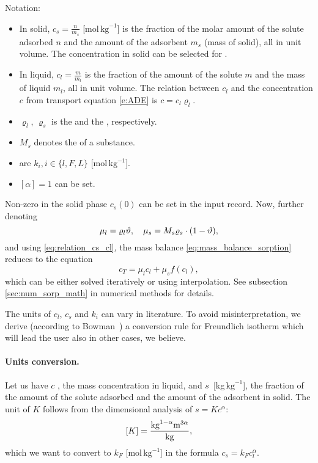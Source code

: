 Notation:
\begin{itemize}
 \item In solid, $c_s = \frac{n}{m_s}$ [mol\,$\mathrm{kg}^{-1}$] is the fraction of the molar amount of the solute 
       adsorbed $n$ and the amount of the adsorbent $m_s$ (mass of solid), all in unit volume. The concentration
       in solid can be selected for .
 \item In liquid, $c_l = \frac{m}{m_l}$ \units{}{}{} is the fraction of the amount of the solute $m$ and 
       the mass of liquid $m_l$, all in unit volume. The relation between $c_l$ and the concentration $c$ from 
       transport equation \eqref{e:ADE} is $c = c_l \varrho_l$.
 \item $\varrho_l$, $\varrho_s$ is the  and 
       the , respectively.
 \item $M_s$ denotes the  of a substance.
 \item {} are $k_i, i\in\{ l,F,L\}$ [mol\,$\mathrm{kg}^{-1}$].
 \item {} $[\alpha] = 1$ can be set.
\end{itemize}

Non-zero  in the solid phase $c_s(0)$ can be set in the input record. 
Now, further denoting \[ \mu_l = \varrho_l \vartheta, \quad \mu_s = M_s \varrho_s\cdot(1-\vartheta), \]
and using \eqref{eq:relation_cs_cl}, the mass balance \eqref{eq:mass_balance_sorption} reduces to the equation
\begin{equation}
 c_T = \mu_l c_l + \mu_s f(c_l),
 \label{eq:nonlin_sorption}
\end{equation}
which can be either solved iteratively or using interpolation. See subsection \ref{sec:num_sorp_math} 
in numerical methods for details.

The units of $c_l$, $c_s$ and $k_i$ can vary in literature. To avoid misinterpretation, we derive (according
to Bowman~\cite{bowman_conversion_1982}) a conversion rule for Freundlich isotherm which will lead the user 
also in other cases, we believe. 

\paragraph{Units conversion.} Let us have $c$ , the mass concentration in liquid, and $s$~[kg\,$\mathrm{kg}^{-1}$], 
the fraction of the amount of the solute adsorbed and the amount of the adsorbent in solid. 
The unit of $K$ follows from the dimensional analysis of $s=Kc^{\alpha}$:
\[[K] = \frac{\rm{kg}^{1-\alpha}\rm{m}^{3\alpha}}{\rm{kg}},\]
which we want to convert to $k_F$ [mol\,$\mathrm{kg}^{-1}$] in the formula $c_s=k_Fc_l^\alpha$.

